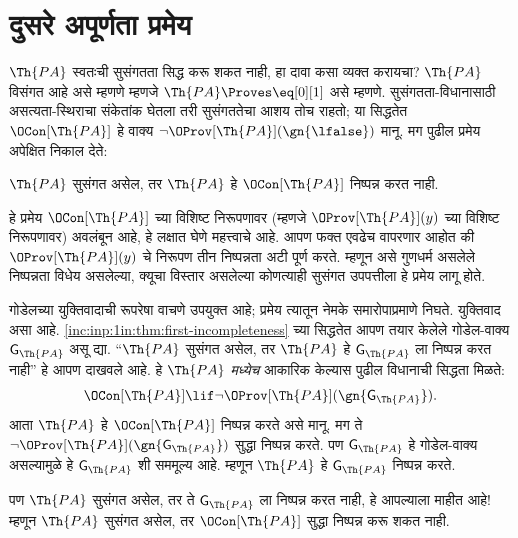 \section{दुसरे अपूर्णता प्रमेय}\label{inc:inp:2in:sec}

$\Th{PA}$ स्वतःची सुसंगतता सिद्ध करू
शकत नाही, हा दावा कसा व्यक्त करायचा?
$\Th{PA}$ विसंगत आहे असे म्हणणे
म्हणजे $\Th{PA} \Proves \eq[0][1]$
असे म्हणणे. सुसंगतता-विधानासाठी
असत्यता-स्थिराचा संकेतांक घेतला तरी
सुसंगततेचा आशय तोच राहतो; या
सिद्धतेत $\OCon[\Th{PA}]$ हे
वाक्य $\lnot
\OProv[\Th{PA}](\gn{\lfalse})$
मानू. मग पुढील प्रमेय अपेक्षित
निकाल देते:

\begin{thm}
\label{inc:inp:2in:thm:second-incompleteness}
$\Th{PA}$ सुसंगत असेल, तर
$\Th{PA}$ हे
$\OCon[\Th{PA}]$ निष्पन्न
करत नाही.
\end{thm}

हे प्रमेय $\OCon[\Th{PA}]$
च्या विशिष्ट निरूपणावर
(म्हणजे $\OProv[\Th{PA}](y)$
च्या विशिष्ट निरूपणावर)
अवलंबून आहे, हे लक्षात
घेणे महत्त्वाचे आहे.
आपण फक्त एवढेच वापरणार
आहोत की $\OProv[\Th{PA}](y)$
चे निरूपण तीन
निष्पन्नता अटी पूर्ण
करते. म्हणून असे गुणधर्म
असलेले निष्पन्नता
विधेय असलेल्या, क्यूचा विस्तार असलेल्या कोणत्याही
सुसंगत उपपत्तीला हे प्रमेय लागू
होते.

गोडेलच्या युक्तिवादाची
रूपरेषा वाचणे उपयुक्त आहे;
प्रमेय त्यातून नेमके
समारोपाप्रमाणे निघते.
युक्तिवाद असा आहे.
\ref{inc:inp:1in:thm:first-incompleteness}
च्या सिद्धतेत आपण तयार
केलेले गोडेल-वाक्य
$\mathsf{G}_\Th{PA}$ असू द्या.
“$\Th{PA}$ सुसंगत
असेल, तर $\Th{PA}$
हे $\mathsf{G}_\Th{PA}$ ला
निष्पन्न करत नाही”
हे आपण दाखवले आहे.
हे $\Th{PA}$
\emph{मध्येच} आकारिक
केल्यास पुढील विधानाची
सिद्धता मिळते:
\[\OCon[\Th{PA}] \lif \lnot \OProv[\Th{PA}](\gn{\mathsf{G}_\Th{PA}}).
\]
आता $\Th{PA}$ हे
$\OCon[\Th{PA}]$
निष्पन्न करते असे
मानू. मग ते $\lnot
\OProv[\Th{PA}](\gn{\mathsf{G}_\Th{PA}})$
सुद्धा निष्पन्न
करते. पण $\mathsf{G}_\Th{PA}$
हे गोडेल-वाक्य असल्यामुळे
हे $\mathsf{G}_\Th{PA}$ शी
सममूल्य आहे. म्हणून
$\Th{PA}$ हे
$\mathsf{G}_\Th{PA}$
निष्पन्न करते.

पण $\Th{PA}$ सुसंगत
असेल, तर ते
$\mathsf{G}_\Th{PA}$ ला
निष्पन्न करत
नाही, हे आपल्याला
माहीत आहे!{}
म्हणून $\Th{PA}$
सुसंगत असेल, तर
$\OCon[\Th{PA}]$
सुद्धा निष्पन्न
करू शकत नाही.

